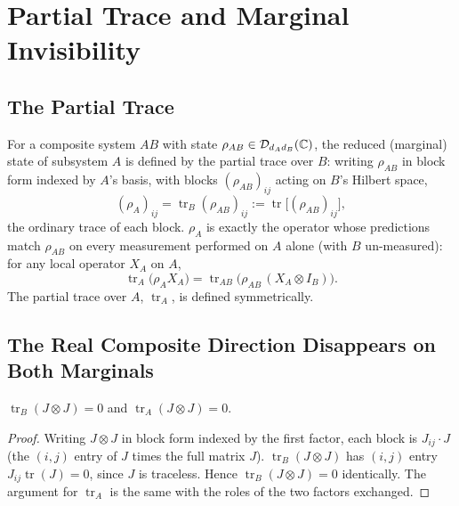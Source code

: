 \chapter{Partial Trace and Marginal Invisibility}
\label{ch:partial-trace}

\section{The Partial Trace}

For a composite system $AB$ with state $\rho_{AB} \in \mathcal D_{d_Ad_B}(\mathbb{C})$,
the reduced (marginal) state of subsystem $A$ is defined by the partial trace
over $B$: writing $\rho_{AB}$ in block form indexed by $A$'s basis, with
blocks $(\rho_{AB})_{ij}$ acting on $B$'s Hilbert space,
\begin{equation}
(\rho_A)_{ij} = \operatorname{tr}_B(\rho_{AB})_{ij} :=
\operatorname{tr}\big[(\rho_{AB})_{ij}\big],
\end{equation}
the ordinary trace of each block. $\rho_A$ is exactly the operator whose
predictions match $\rho_{AB}$ on every measurement performed on $A$ alone
(with $B$ un-measured): for any local operator $X_A$ on $A$,
\begin{equation}
\operatorname{tr}_A\big(\rho_A X_A\big) = \operatorname{tr}_{AB}\big(\rho_{AB}\,
(X_A\otimes I_B)\big).
\end{equation}
The partial trace over $A$, $\operatorname{tr}_A$, is defined symmetrically.

\section{The Real Composite Direction Disappears on Both Marginals}

\begin{proposition}
\label{prop:JJ-invisible}
$\operatorname{tr}_B(J\otimes J) = 0$ and $\operatorname{tr}_A(J\otimes J) =
0$.
\end{proposition}

\begin{proof}
Writing $J\otimes J$ in block form indexed by the first factor, each block is
$J_{ij} \cdot J$ (the $(i,j)$ entry of $J$ times the full matrix $J$).
$\operatorname{tr}_B(J\otimes J)$ has $(i,j)$ entry $J_{ij}\operatorname{tr}(J)
= 0$, since $J$ is traceless. Hence $\operatorname{tr}_B(J\otimes J) = 0$
identically. The argument for $\operatorname{tr}_A$ is the same with the
roles of the two factors exchanged.
\end{proof}

